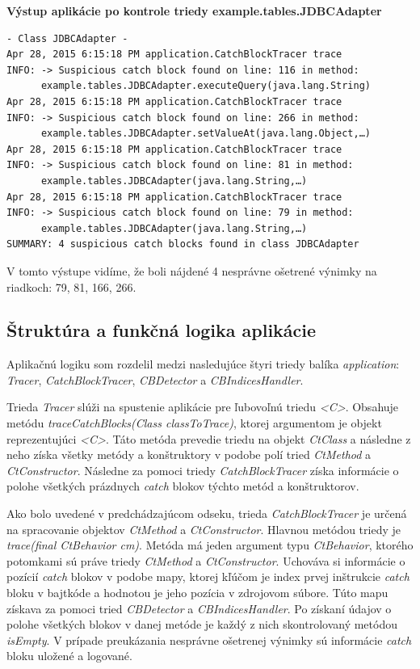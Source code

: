 \documentclass[11pt,final,oneside]{fithesis}
\newenvironment{example}[1]
{
\vspace{3mm}
\noindent\textbf{#1}
\vspace{2mm}
}
{
\vspace{3mm}
}
\begin{document}
\begin{example}{Výstup aplikácie po kontrole triedy example.tables.JDBCAdapter}
\begin{verbatim}
- Class JDBCAdapter -
Apr 28, 2015 6:15:18 PM application.CatchBlockTracer trace
INFO: -> Suspicious catch block found on line: 116 in method:
      example.tables.JDBCAdapter.executeQuery(java.lang.String)
Apr 28, 2015 6:15:18 PM application.CatchBlockTracer trace
INFO: -> Suspicious catch block found on line: 266 in method:
      example.tables.JDBCAdapter.setValueAt(java.lang.Object,…)
Apr 28, 2015 6:15:18 PM application.CatchBlockTracer trace
INFO: -> Suspicious catch block found on line: 81 in method:
      example.tables.JDBCAdapter(java.lang.String,…)
Apr 28, 2015 6:15:18 PM application.CatchBlockTracer trace
INFO: -> Suspicious catch block found on line: 79 in method:
      example.tables.JDBCAdapter(java.lang.String,…)
SUMMARY: 4 suspicious catch blocks found in class JDBCAdapter
\end{verbatim}
\end{example}

V tomto výstupe vidíme, že boli nájdené 4 nesprávne ošetrené výnimky na 
riadkoch: 79, 81, 166, 266.

\subsection{Štruktúra a funkčná logika aplikácie}
Aplikačnú logiku som rozdelil medzi nasledujúce štyri triedy balíka
\textit{application}: \textit{Tracer}, \textit{CatchBlockTracer},
\textit{CBDetector} a \textit{CBIndicesHandler}. 

Trieda \textit{Tracer} slúži na spustenie aplikácie pre ľubovoľnú 
triedu \textit{<C>}. Obsahuje metódu \textit{traceCatchBlocks(Class 
classToTrace)}, ktorej argumentom je objekt reprezentujúci \textit{<C>}. Táto 
metóda prevedie triedu na objekt \textit{CtClass} a následne z neho získa 
všetky metódy a konštruktory v podobe polí tried \textit{CtMethod} a 
\textit{CtConstructor}. Následne za pomoci triedy \textit{CatchBlockTracer} 
získa informácie o polohe všetkých prázdnych \textit{catch} blokov týchto 
metód a konštruktorov. 

Ako bolo uvedené v predchádzajúcom odseku, trieda \textit{CatchBlockTracer} je 
určená na spracovanie objektov \textit{CtMethod} a \textit{CtConstructor}. 
Hlavnou metódou triedy je \textit{trace(final CtBehavior cm)}. Metóda má jeden 
argument typu \textit{CtBehavior}, ktorého potomkami sú práve triedy
\textit{CtMethod} a
\textit{CtConstructor}. Uchováva si informácie o pozícií \textit{catch} blokov 
v podobe mapy, ktorej kľúčom je index prvej inštrukcie \textit{catch} bloku v 
bajtkóde a hodnotou je jeho pozícia v zdrojovom súbore. Túto mapu získava za 
pomoci tried \textit{CBDetector} a \textit{CBIndicesHandler}. Po získaní 
údajov o polohe všetkých blokov v danej metóde je každý z nich 
skontrolovaný metódou \textit{isEmpty}. V prípade preukázania nesprávne 
ošetrenej výnimky sú informácie \textit{catch} bloku uložené a logované. 
\end{document}
